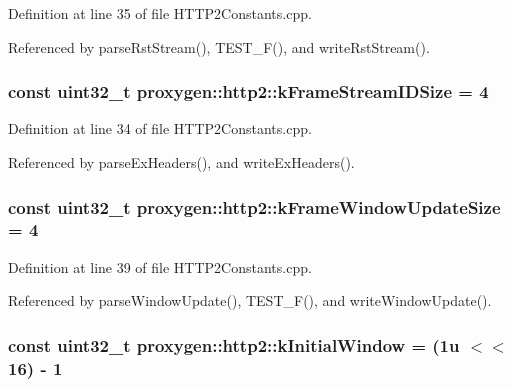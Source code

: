 Definition at line 35 of file H\+T\+T\+P2\+Constants.\+cpp.



Referenced by parse\+Rst\+Stream(), T\+E\+S\+T\+\_\+\+F(), and write\+Rst\+Stream().

\subsubsection[{k\+Frame\+Stream\+I\+D\+Size}]{\setlength{\rightskip}{0pt plus 5cm}const uint32\+\_\+t proxygen\+::http2\+::k\+Frame\+Stream\+I\+D\+Size = 4}\label{namespaceproxygen_1_1http2_aa2d5fdfcdf118bc1ed1298c1d7eeb8d2}


Definition at line 34 of file H\+T\+T\+P2\+Constants.\+cpp.



Referenced by parse\+Ex\+Headers(), and write\+Ex\+Headers().

\subsubsection[{k\+Frame\+Window\+Update\+Size}]{\setlength{\rightskip}{0pt plus 5cm}const uint32\+\_\+t proxygen\+::http2\+::k\+Frame\+Window\+Update\+Size = 4}\label{namespaceproxygen_1_1http2_afc6d3afbce0ed1f1f902cf365c543512}


Definition at line 39 of file H\+T\+T\+P2\+Constants.\+cpp.



Referenced by parse\+Window\+Update(), T\+E\+S\+T\+\_\+\+F(), and write\+Window\+Update().

\subsubsection[{k\+Initial\+Window}]{\setlength{\rightskip}{0pt plus 5cm}const uint32\+\_\+t proxygen\+::http2\+::k\+Initial\+Window = (1u $<$$<$ 16) -\/ 1}\label{namespaceproxygen_1_1http2_a285488ceb67f66fe8203e5378f70334b}


